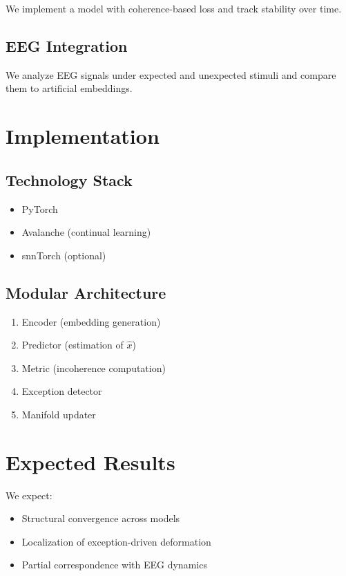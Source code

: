 \documentclass[11pt]{article}
\begin{document}
We implement a model with coherence-based loss and track stability over time.

\subsection{EEG Integration}

We analyze EEG signals under expected and unexpected stimuli and compare them to artificial embeddings.

\section{Implementation}

\subsection{Technology Stack}

\begin{itemize}
    \item PyTorch
    \item Avalanche (continual learning)
    \item snnTorch (optional)
\end{itemize}

\subsection{Modular Architecture}

\begin{enumerate}
    \item Encoder (embedding generation)
    \item Predictor (estimation of $\hat{x}$)
    \item Metric (incoherence computation)
    \item Exception detector
    \item Manifold updater
\end{enumerate}

\section{Expected Results}

We expect:

\begin{itemize}
    \item Structural convergence across models
    \item Localization of exception-driven deformation
    \item Partial correspondence with EEG dynamics
\end{itemize}
\end{document}
